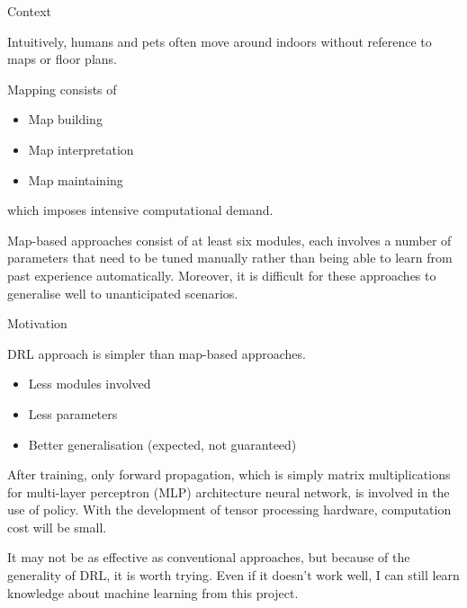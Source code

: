 \begin{frame}{Context}

Intuitively, humans and pets often move around indoors without reference to maps or floor plans.

\bigskip

Mapping consists of
\begin{itemize}
    \item Map building
    \item Map interpretation
    \item Map maintaining
\end{itemize}
which imposes intensive computational demand.

\bigskip

Map-based approaches consist of at least six modules, each involves a number of parameters that need to be tuned manually rather than being able to learn from past experience automatically. Moreover, it is difficult for these approaches to generalise well to unanticipated scenarios.

\end{frame}


\begin{frame}{Motivation}

DRL approach is simpler than map-based approaches.
\begin{itemize}
    \item Less modules involved
    \item Less parameters
    \item Better generalisation (expected, not guaranteed)
\end{itemize}

\bigskip

After training, only forward propagation, which is simply matrix multiplications for multi-layer perceptron (MLP) architecture neural network, is involved in the use of policy. With the development of tensor processing hardware, computation cost will be small.

\bigskip

It may not be as effective as conventional approaches, but because of the generality of DRL, it is worth trying. Even if it doesn't work well, I can still learn knowledge about machine learning from this project.

\end{frame}
